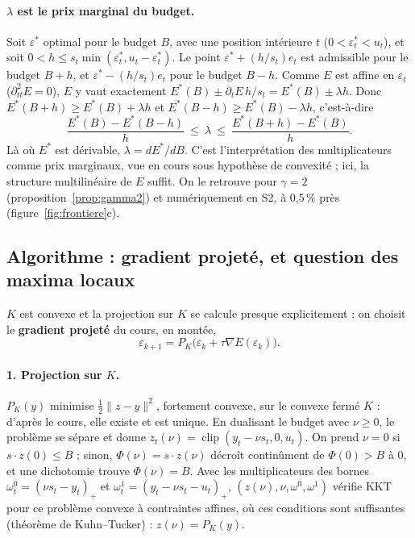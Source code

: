 \documentclass[11pt,a4paper]{article}
\newcommand{\nr}[1]{\|#1\|}
\newcommand{\clip}{\operatorname{clip}}
\theoremstyle{plain}
\theoremstyle{definition}
\begin{document}
\paragraph{$\lambda$ est le prix marginal du budget.} Soit $\varepsilon^*$ optimal pour le budget $B$, avec une position intérieure $t$ ($0<\varepsilon^*_t<u_t$), et soit $0<h\le s_t\min(\varepsilon^*_t,u_t-\varepsilon^*_t)$. Le point $\varepsilon^*+(h/s_t)e_t$ est admissible pour le budget $B+h$, et $\varepsilon^*-(h/s_t)e_t$ pour le budget $B-h$. Comme $E$ est affine en $\varepsilon_t$ ($\partial^2_{tt}E=0$), $E$ y vaut exactement $E^*(B)\pm\partial_tE\,h/s_t=E^*(B)\pm\lambda h$. Donc $E^*(B+h)\ge E^*(B)+\lambda h$ et $E^*(B-h)\ge E^*(B)-\lambda h$, c'est-à-dire
\begin{equation}\label{eq:encadrement}
\frac{E^*(B)-E^*(B-h)}{h}\ \le\ \lambda\ \le\ \frac{E^*(B+h)-E^*(B)}{h}.
\end{equation}
Là où $E^*$ est dérivable, $\lambda=dE^*/dB$. C'est l'interprétation des multiplicateurs comme prix marginaux, vue en cours sous hypothèse de convexité ; ici, la structure multilinéaire de $E$ suffit. On le retrouve pour $\gamma=2$ (proposition~\ref{prop:gamma2}) et numériquement en S2, à 0,5\,\% près (figure~\ref{fig:frontiere}c).

\subsection{Algorithme : gradient projeté, et question des maxima locaux}\label{sec:algoII}
$K$ est convexe et la projection sur $K$ se calcule presque explicitement : on choisit le \textbf{gradient projeté} du cours, en montée,
\[\varepsilon_{k+1}=P_K\big(\varepsilon_k+\tau\nabla E(\varepsilon_k)\big).\]

\paragraph{1. Projection sur $K$.} $P_K(y)$ minimise $\tfrac12\nr{z-y}^2$, fortement convexe, sur le convexe fermé $K$ : d'après le cours, elle existe et est unique. En dualisant le budget avec $\nu\ge0$, le problème se sépare et donne $z_t(\nu)=\clip(y_t-\nu s_t,0,u_t)$. On prend $\nu=0$ si $s\cdot z(0)\le B$ ; sinon, $\Phi(\nu)=s\cdot z(\nu)$ décroît continûment de $\Phi(0)>B$ à $0$, et une dichotomie trouve $\Phi(\nu)=B$. Avec les multiplicateurs des bornes $\omega^0_t=(\nu s_t-y_t)_+$ et $\omega^1_t=(y_t-\nu s_t-u_t)_+$, $(z(\nu),\nu,\omega^0,\omega^1)$ vérifie KKT pour ce problème convexe à contraintes affines, où ces conditions sont suffisantes (théorème de Kuhn--Tucker) : $z(\nu)=P_K(y)$.
\end{document}

